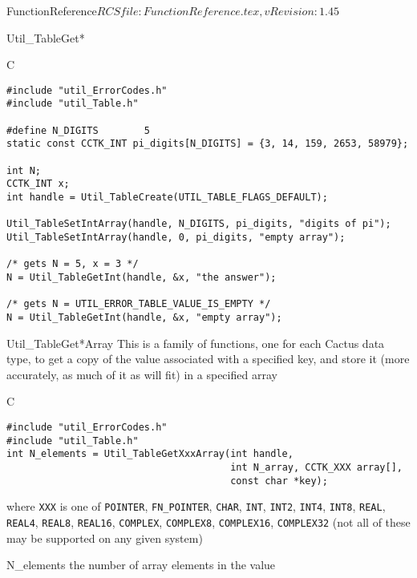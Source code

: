\begin{cactuspart}{5}{FunctionReference}{$RCSfile: FunctionReference.tex,v $}{$Revision: 1.45 $}
\begin{FunctionDescription}{Util\_TableGet*}
\begin{Example}{C}
\begin{verbatim}
#include "util_ErrorCodes.h"
#include "util_Table.h"

#define N_DIGITS        5
static const CCTK_INT pi_digits[N_DIGITS] = {3, 14, 159, 2653, 58979};

int N;
CCTK_INT x;
int handle = Util_TableCreate(UTIL_TABLE_FLAGS_DEFAULT);

Util_TableSetIntArray(handle, N_DIGITS, pi_digits, "digits of pi");
Util_TableSetIntArray(handle, 0, pi_digits, "empty array");

/* gets N = 5, x = 3 */
N = Util_TableGetInt(handle, &x, "the answer");

/* gets N = UTIL_ERROR_TABLE_VALUE_IS_EMPTY */
N = Util_TableGetInt(handle, &x, "empty array");
\end{verbatim}
\end{Example}
\end{FunctionDescription}


\begin{FunctionDescription}{Util\_TableGet*Array}
\label{Util-TableGet*Array}
This is a family of functions, one for each Cactus data type, to get
a copy of the value associated with a specified key, and store it
(more accurately, as much of it as will fit) in a specified array

\begin{Synopsis}{C}
\begin{verbatim}
#include "util_ErrorCodes.h"
#include "util_Table.h"
int N_elements = Util_TableGetXxxArray(int handle,
                                       int N_array, CCTK_XXX array[],
                                       const char *key);
\end{verbatim}
where \verb|XXX| is one of
   \verb|POINTER|, \verb|FN_POINTER|,
   \verb|CHAR|,
   \verb|INT|, \verb|INT2|, \verb|INT4|, \verb|INT8|,
   \verb|REAL|, \verb|REAL4|, \verb|REAL8|, \verb|REAL16|,
   \verb|COMPLEX|, \verb|COMPLEX8|, \verb|COMPLEX16|, \verb|COMPLEX32|
(not all of these may be supported on any given system)
\end{Synopsis}

\begin{Result}{N\_elements}
the number of array elements in the value
\end{Result}


\end{FunctionDescription}
\end{cactuspart}
